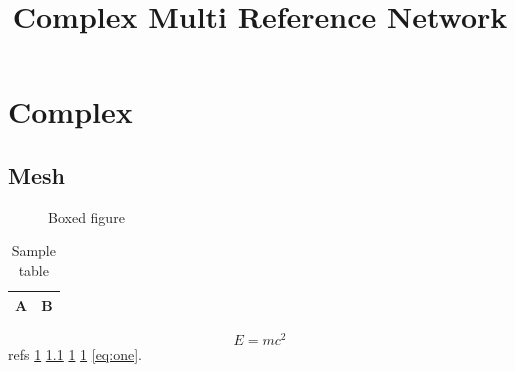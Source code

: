 \documentclass{article}
\begin{document}
\title{Complex Multi Reference Network}\maketitle
\section{Complex}\label{sec:complex}\subsection{Mesh}\label{sub:mesh}\begin{figure}[h]\centering{}\caption{Boxed figure}\label{fig:box}\end{figure}\begin{table}[h]\centering\caption{Sample table}\label{tab:s}\begin{tabular}{|l|l|}\hline A&B\\\hline\end{tabular}\end{table}\begin{equation}E=mc^2\label{eq:one}\end{equation} refs \ref{sec:complex} \ref{sub:mesh} \ref{fig:box} \ref{tab:s} \ref{eq:one}.
\end{document}
